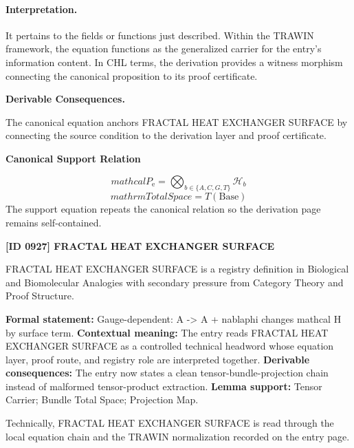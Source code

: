 \paragraph{Interpretation.}
It pertains to the fields or functions just described. Within the TRAWIN framework, the equation functions as the generalized carrier for the entry’s information content. In CHL terms, the derivation provides a witness morphism connecting the canonical proposition to its proof certificate.

\par\vspace{0.35em}
\noindent\textbf{Derivable Consequences.}\quad
\begingroup
\footnotesize
\raggedright
The canonical equation anchors FRACTAL HEAT EXCHANGER SURFACE by connecting the source condition to the derivation layer and proof certificate.
\par\endgroup

\noindent\textbf{Canonical Support Relation}\par
\[
mathcal{P}_{\mathrm{e}}=\bigotimes_{b\in\{A,C,G,T\}}\mathcal{H}_b
\]
\[
mathrm{TotalSpace}=T(\mathrm{Base})
\]
\noindent The support equation repeats the canonical relation so the derivation page remains self-contained.\par

\clearpage
\noindent\textbf{[ID 0927] FRACTAL HEAT EXCHANGER SURFACE}\par
\vspace{0.35em}
\begingroup\small
{}
FRACTAL HEAT EXCHANGER SURFACE is a registry definition in Biological and Biomolecular Analogies with secondary pressure from Category Theory and Proof Structure.

\begingroup\footnotesize\setlength{\emergencystretch}{3em}\sloppy
\textbf{Formal statement:} Gauge-dependent: A -> A + nablaphi changes mathcal H by surface term. \textbf{Contextual meaning:} The entry reads FRACTAL HEAT EXCHANGER SURFACE as a controlled technical headword whose equation layer, proof route, and registry role are interpreted together. \textbf{Derivable consequences:} The entry now states a clean tensor-bundle-projection chain instead of malformed tensor-product extraction. \textbf{Lemma support:} Tensor Carrier; Bundle Total Space; Projection Map.\par
\endgroup

Technically, FRACTAL HEAT EXCHANGER SURFACE is read through the local equation chain and the TRAWIN normalization recorded on the entry page.


